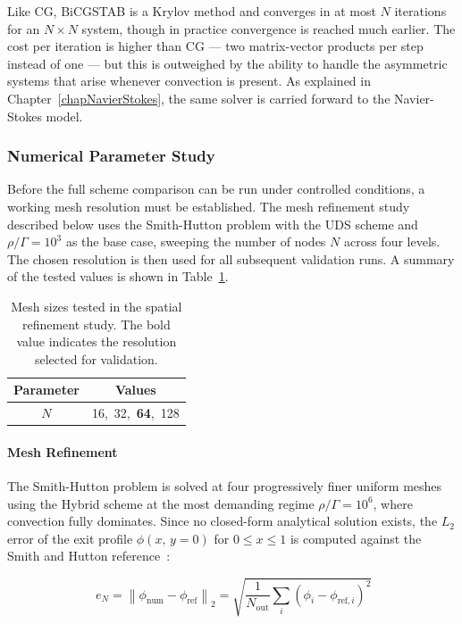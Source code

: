 Like CG, BiCGSTAB is a Krylov method and converges in at most $N$ iterations for an $N \times N$ system, though in practice convergence is reached much earlier. The cost per iteration is higher than CG — two matrix-vector products per step instead of one — but this is outweighed by the ability to handle the asymmetric systems that arise whenever convection is present. As explained in Chapter~\ref{chapNavierStokes}, the same solver is carried forward to the Navier-Stokes model.


\subsubsection{Numerical Parameter Study}
Before the full scheme comparison can be run under controlled conditions, a working mesh resolution must be established. The mesh refinement study described below uses the Smith-Hutton problem with the UDS scheme and $\rho/\Gamma = 10^3$ as the base case, sweeping the number of nodes $N$ across four levels. The chosen resolution is then used for all subsequent validation runs. A summary of the tested values is shown in Table~\ref{tabConvNumerical}.

\begin{table}[ht]
    \centering
    \begin{tabular}{|c|c|}
        \hline
        Parameter & Values \\
        \hline
        $N$ & 16,\ 32,\ \textbf{64},\ 128 \\
        \hline
    \end{tabular}
    \caption{Mesh sizes tested in the spatial refinement study. The bold value indicates the resolution selected for validation.}
    \label{tabConvNumerical}
\end{table}

\paragraph{Mesh Refinement}
The Smith-Hutton problem is solved at four progressively finer uniform meshes using the Hybrid scheme at the most demanding regime $\rho/\Gamma = 10^6$, where convection fully dominates. Since no closed-form analytical solution exists, the $L_2$ error of the exit profile $\phi(x,\, y=0)$ for $0 \leq x \leq 1$ is computed against the Smith and Hutton reference~\cite{SmithHutton1982}:

\begin{equation}~\label{eqSHL2}
    e_N = \left\| \phi_{\mathrm{num}} - \phi_{\mathrm{ref}} \right\|_2 = \sqrt{\frac{1}{N_{\mathrm{out}}} \sum_{i} (\phi_i - \phi_{\mathrm{ref},i})^2}
\end{equation}


